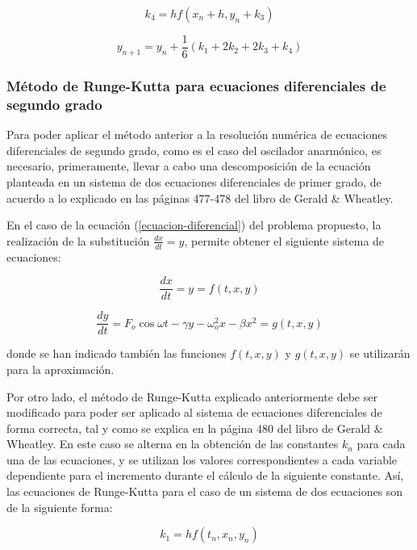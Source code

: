 \documentclass[11pt]{article}
\begin{document}
\begin{equation}
	k_4 = hf(x_n + h, y_n + k_3)
\end{equation} 

\begin{equation}
	y_{n+1} = y_{n} + \frac{1}{6}(k_1 + 2k_2 + 2k_3 + k_4)
\end{equation}

\subsubsection{Método de Runge-Kutta para ecuaciones diferenciales de segundo grado}
Para poder aplicar el método anterior a la resolución numérica de ecuaciones diferenciales de segundo grado, como es el caso del oscilador anarmónico, es necesario, primeramente, llevar a cabo una descomposición de la ecuación planteada en un sistema de dos ecuaciones diferenciales
de primer grado, de acuerdo a lo explicado en las páginas 477-478 del libro de Gerald \& Wheatley. 

En el caso de la ecuación (\ref{ecuacion-diferencial}) del problema propuesto, la realización de la substitución $\frac{dx}{dt} = y$, permite obtener el siguiente sistema de ecuaciones:

\begin{equation}
	\frac{dx}{dt} = y = f(t, x, y)
\end{equation}

\begin{equation}
	\frac{dy}{dt} = F_{o}\cos{\omega{}t} -\gamma{}y - \omega_{o}^2x - \beta{}x^2 = g(t, x, y) 	
\end{equation}

donde se han indicado también las funciones $f(t, x, y)$ y $g(t, x, y)$ se utilizarán para la aproximación.  

Por otro lado, el método de Runge-Kutta explicado anteriormente debe ser modificado para poder ser aplicado al sistema de ecuaciones diferenciales de forma correcta, tal y como se explica en la página 480 del libro de Gerald \& Wheatley. En este caso se alterna en la obtención de las constantes $k_n$ para cada una de las ecuaciones, y se utilizan los valores correspondientes a cada variable dependiente
para el incremento durante el cálculo de la siguiente constante. Así, las ecuaciones de Runge-Kutta para el caso de un sistema de dos ecuaciones son de la siguiente forma:

\begin{equation}
	k_1 = hf(t_n, x_n, y_n)
\end{equation}
\end{document}
